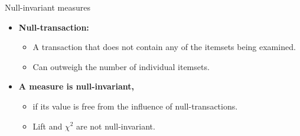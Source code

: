 \documentclass[aspectratio=169,t,xcolor=dvipsnames]{beamer}
\begin{document}
  {
    \begin{frame}{Null-invariant measures}
    \begin{itemize}
      \item \textbf{\color{airforceblue}Null-transaction:}
      \begin{itemize}
        \item A transaction that does not contain any of the itemsets being examined.
        \item Can outweigh the number of individual itemsets.
      \end{itemize}
      \item \textbf{\color{airforceblue}A measure is null-invariant,}
      \begin{itemize}
        \item if its value is free from the influence of null-transactions.
        \item Lift and $\chi^2$ are not null-invariant.
      \end{itemize}
    \end{itemize}
    \end{frame}
  }
\end{document}
